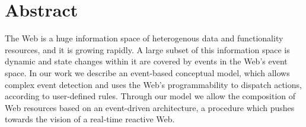 \chapter*{Abstract}

The Web is a huge information space of heterogenous data and functionality resources, and it is growing rapidly.
A large subset of this information space is dynamic and state changes within it are covered by events in the Web's event space.
In our work we describe an event-based conceptual model, which allows complex event detection and uses the Web's programmability to dispatch actions, according to user-defined rules.
Through our model we allow the composition of Web resources based on an event-driven architecture, a procedure which pushes towards the vision of a real-time reactive Web.

